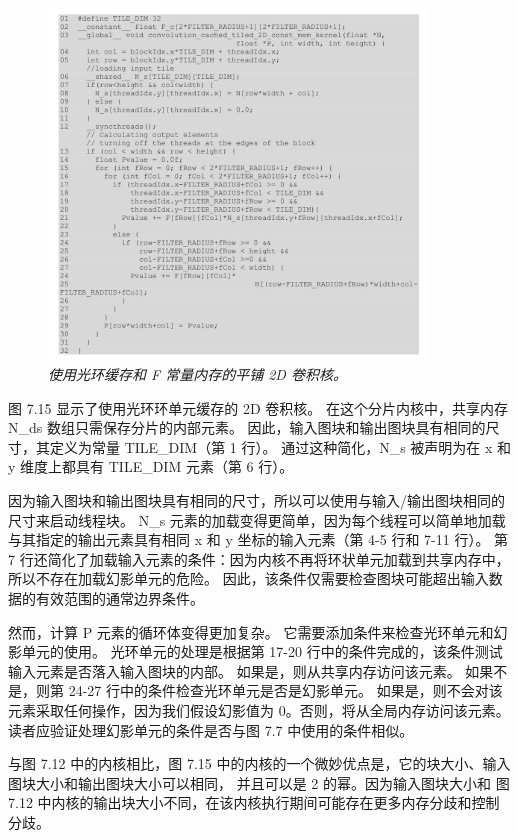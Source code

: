\begin{figure}[H]
	\centering
	\includegraphics[width=0.9\textwidth]{figs/F7.15.png}
	\caption{\textit{使用光环缓存和 F 常量内存的平铺 2D 卷积核。}}
\end{figure}

图 7.15 显示了使用光环环单元缓存的 2D 卷积核。 在这个分片内核中，共享内存 N\_ds 数组只需保存分片的内部元素。 
因此，输入图块和输出图块具有相同的尺寸，其定义为常量 TILE\_DIM（第 1 行）。 
通过这种简化，N\_s 被声明为在 x 和 y 维度上都具有 TILE\_DIM 元素（第 6 行）。

因为输入图块和输出图块具有相同的尺寸，所以可以使用与输入/输出图块相同的尺寸来启动线程块。 
N\_s 元素的加载变得更简单，因为每个线程可以简单地加载与其指定的输出元素具有相同 x 和 y 坐标的输入元素（第 4-5 行和 7-11 行）。 
第 7 行还简化了加载输入元素的条件：因为内核不再将环状单元加载到共享内存中，所以不存在加载幻影单元的危险。 
因此，该条件仅需要检查图块可能超出输入数据的有效范围的通常边界条件。

然而，计算 P 元素的循环体变得更加复杂。 它需要添加条件来检查光环单元和幻影单元的使用。 
光环单元的处理是根据第 17-20 行中的条件完成的，该条件测试输入元素是否落入输入图块的内部。 
如果是，则从共享内存访问该元素。 如果不是，则第 24-27 行中的条件检查光环单元是否是幻影单元。 
如果是，则不会对该元素采取任何操作，因为我们假设幻影值为 0。否则，将从全局内存访问该元素。 
读者应验证处理幻影单元的条件是否与图 7.7 中使用的条件相似。

与图 7.12 中的内核相比，图 7.15 中的内核的一个微妙优点是，它的块大小、输入图块大小和输出图块大小可以相同，
并且可以是 2 的幂。因为输入图块大小和 图 7.12 中内核的输出块大小不同，在该内核执行期间可能存在更多内存分歧和控制分歧。

